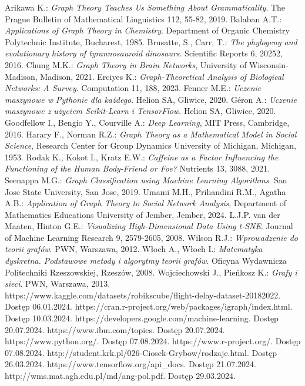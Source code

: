 
\begin{thebibliography}{4}
     Arikawa K.: \textit{Graph Theory Teaches Us Something About Grammaticality}. The Prague Bulletin of Mathematical Linguistics 112, 55-82, 2019.
     Balaban A.T.: \textit{Applications of Graph Theory in Chemistry}. Department of Organic Chemistry Polytechnic Institute, Bucharest, 1985.
     Brusatte, S., Carr, T.: \textit{The phylogeny and evolutionary history of tyrannosauroid dinosaurs}. Scientific Reports 6, 20252, 2016.
     Chung M.K.: \textit{Graph Theory in Brain Networks}, University of Wisconsin-Madison, Madison, 2021.
     Erciyes K.: \textit{Graph-Theoretical Analysis of Biological Networks: A Survey}. Computation 11, 188, 2023.
     Fenner M.E.: \textit{Uczenie maszynowe w Pythonie dla każdego}. Helion SA, Gliwice, 2020.
     Géron A.: \textit{Uczenie maszynowe z użyciem Scikit-Learn i TensorFlow}. Helion SA, Gliwice, 2020.
     Goodfellow I., Bengio Y., Courville A.: \textit{Deep Learning}, MIT Press, Cambridge, 2016.
     Harary F., Norman R.Z.: \textit{Graph Theory as a Mathematical Model in Social Science}, Research Center for Group Dynamics University of Michigan, Michigan, 1953.
     Rodak K., Kokot I., Kratz E.W.: \textit{Caffeine as a Factor Influencing the Functioning of the Human Body-Friend or Foe?} Nutrients 13, 3088, 2021.
     Seenappa M.G.: \textit{Graph Classification using Machine Learning Algorithms}. San Jose State University, San Jose, 2019.
     Umami M.H., Prihandini R.M., Agatha A.B.: \textit{Application of Graph Theory to Social Network Analysis}, Department of Mathematics Educations University of Jember, Jember, 2024.
     L.J.P. van der Maaten, Hinton G.E.: \textit{Visualizing High-Dimensional Data Using t-SNE}. Journal of Machine Learning Research 9, 2579-2605, 2008.
     Wilson R.J.: \textit{Wprowadzenie do teorii grafów}. PWN, Warszawa, 2012.
     Włoch A., Włoch I.: \textit{Matematyka dyskretna. Podstawowe metody i algorytmy teorii grafów}. Oficyna Wydawnicza Politechniki Rzeszowskiej, Rzeszów, 2008.
     Wojciechowski J., Pieńkosz K.: \textit{Grafy i sieci}. PWN, Warszawa, 2013.
     https://www.kaggle.com/datasets/robikscube/flight-delay-dataset-20182022. Dostęp 06.01.2024.
     https://cran.r-project.org/web/packages/igraph/index.html. Dostęp 10.03.2024.
     https://developers.google.com/machine-learning. Dostęp 20.07.2024.
     https://www.ibm.com/topics. Dostęp 20.07.2024.
     https://www.python.org/. Dostęp 07.08.2024.
     https://www.r-project.org/. Dostęp 07.08.2024.
     http://student.krk.pl/026-Ciosek-Grybow/rodzaje.html. Dostęp 26.03.2024.
     https://www.tensorflow.org/api\_docs. Dostęp 21.07.2024.
     http://wms.mat.agh.edu.pl/\texttildelow md/ang-pol.pdf. Dostęp 29.03.2024.
\end{thebibliography}